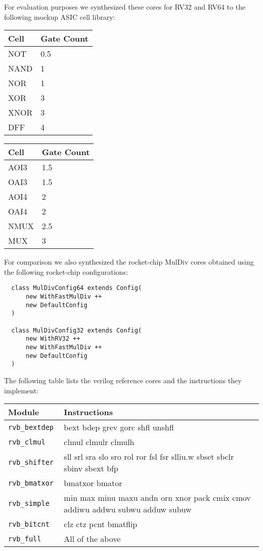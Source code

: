 For evaluation purposes we synthesized these cores for RV32 and RV64 to the following mockup ASIC cell library:

\begin{center}
\begin{tabular}{ll}
Cell & Gate Count \\
\hline
NOT   & 0.5 \\
NAND  & 1   \\
NOR   & 1   \\
XOR   & 3   \\
XNOR  & 3   \\
DFF   & 4   \\
\end{tabular}
\hfil
\begin{tabular}{ll}
Cell & Gate Count \\
\hline
AOI3  & 1.5 \\
OAI3  & 1.5 \\
AOI4  & 2   \\
OAI4  & 2   \\
NMUX  & 2.5 \\
MUX   & 3 \\
\end{tabular}
\end{center}

For comparison we also synthesized the rocket-chip MulDiv cores obtained using the following
rocket-chip configurations:

\begin{verbatim}
  class MulDivConfig64 extends Config(
      new WithFastMulDiv ++
      new DefaultConfig
  )

  class MulDivConfig32 extends Config(
      new WithRV32 ++
      new WithFastMulDiv ++
      new DefaultConfig
  )
\end{verbatim}

The following table lists the verilog reference cores and the instructions they implement:

\begin{center}
\begin{tabular}{lp{6cm}}
Module & Instructions \\
\hline
\tt rvb\_bextdep  & bext bdep grev gorc shfl unshfl                                               \\
\tt rvb\_clmul    & clmul clmulr clmulh                                                           \\
\tt rvb\_shifter  & sll srl sra slo sro rol ror fsl fsr slliu.w sbset sbclr sbinv sbext bfp       \\
\tt rvb\_bmatxor  & bmatxor bmator                                                                \\
\tt rvb\_simple   & min max minu maxu andn orn xnor pack cmix cmov addiwu addwu subwu adduw subuw \\
\tt rvb\_bitcnt   & clz ctz pcnt bmatflip                                                         \\
\tt rvb\_full     & All of the above                                                              \\
\end{tabular}
\end{center}

